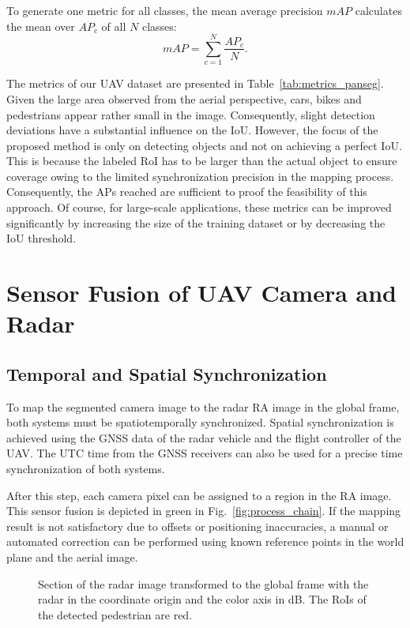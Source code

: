 \documentclass[conference]{IEEEtran}
\begin{document}
To generate one metric for all classes, the mean average precision $mAP$ calculates the mean over $AP_c$ of all $N$ classes:
\begin{equation}
	mAP = \sum_{c=1}^{N}\frac{AP_c}{N} \text{.}
\end{equation}

The metrics of our UAV dataset are presented in Table~\ref{tab:metrics_panseg}.
Given the large area observed from the aerial perspective, cars, bikes and pedestrians appear rather small in the image.
Consequently, slight detection deviations have a substantial influence on the IoU.
However, the focus of the proposed method is only on detecting objects and not on achieving a perfect IoU.
This is because the labeled RoI has to be larger than the actual object to ensure coverage owing to the limited synchronization precision in the mapping process.
Consequently, the APs reached are sufficient to proof the feasibility of this approach.
Of course, for large-scale applications, these metrics can be improved significantly by increasing the size of the training dataset or by decreasing the IoU threshold.

\section{Sensor Fusion of UAV Camera and Radar}

\subsection{Temporal and Spatial Synchronization}

To map the segmented camera image to the radar RA image in the global frame, both systems must be spatiotemporally synchronized.
Spatial synchronization is achieved using the GNSS data of the radar vehicle and the flight controller of the UAV.
The UTC time from the GNSS receivers can also be used for a precise time synchronization of both systems.

After this step, each camera pixel can be assigned to a region in the RA image.
This sensor fusion is depicted in green in Fig.~\ref{fig:process_chain}.
If the mapping result is not satisfactory due to offsets or positioning inaccuracies, a manual or automated correction can be performed using known reference points in the world plane and the aerial image.


\begin{figure}[tb]
    \centering
		
    \vspace{-0.2cm}
    \caption{Section of the radar image transformed to the global frame with the radar in the coordinate origin and the color axis in dB. The RoIs of the detected pedestrian are red.}
    \label{fig:cart_rois}
\end{figure}
\end{document}
